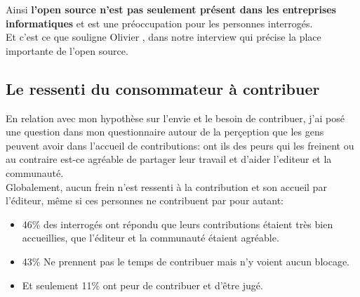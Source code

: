			\newpage

			Ainsi \textbf{l'open source n'est pas seulement présent dans les entreprises informatiques} et est une préoccupation pour les personnes interrogés.\\

			Et c'est ce que souligne Olivier , dans notre interview qui précise la place importante de l'open source.

			\begin{center}
				\textit{
				}
			\end{center}

		\subsection{Le ressenti du consommateur à contribuer}

			En relation avec mon hypothèse sur l'envie et le besoin de contribuer, j'ai posé une question dans mon questionnaire autour de la perçeption que les gens peuvent avoir dans l'accueil de contributions: ont ils des peurs qui les freinent ou au contraire est-ce agréable de partager leur travail et d'aider l'editeur et la communauté.\\

			Globalement, aucun frein n'est ressenti à la contribution et son accueil par l'éditeur, même si ces personnes ne contribuent par pour autant:

			\begin{itemize}[label=\textbullet, font=\LARGE \color{burntorange}]
				\item 46\% des interrogés ont répondu que leurs contributions étaient très bien accueillies, que l'éditeur et la communauté étaient agréable.
				\item 43\% Ne prennent pas le temps de contribuer mais n'y voient aucun blocage.
				\item Et seulement 11\% ont peur de contribuer et d'être jugé.
			\end{itemize}

